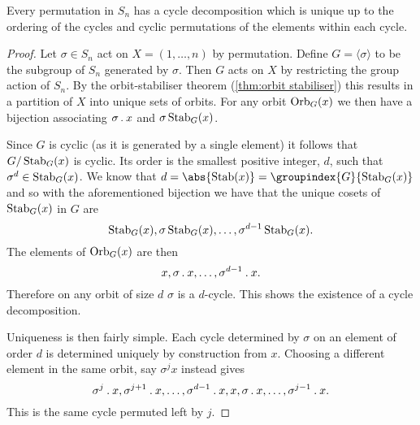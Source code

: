 \begin{lma}{}{}
    Every permutation in \(S_n\) has a cycle decomposition which is unique
    up to the ordering of the cycles and cyclic permutations of the elements within
    each cycle.
    
    \begin{proof}
        Let \(\sigma \in S_n\) act on \(X = (1, \dotsc, n)\) by permutation.
        Define \(G = \langle \sigma \rangle\) to be the subgroup of \(S_n\)
        generated by \(\sigma\).
        Then \(G\) acts on \(X\) by restricting the group action of \(S_n\).
        By the orbit-stabiliser theorem (\cref{thm:orbit stabiliser}) this
        results in a partition of \(X\) into unique sets of orbits.
        For any orbit \(\operatorname{Orb}_{G}(x)\) we then have a bijection associating
        \(\sigma\mathbin{.} x\) and \(\sigma\operatorname{Stab}_G(x)\).
        
        Since \(G\) is cyclic (as it is generated by a single element) it
        follows that \(G/\operatorname{Stab}_G(x)\) is cyclic.
        Its order is the smallest positive integer, \(d\), such that
        \(\sigma^d \in \operatorname{Stab}_G(x)\).
        We know that \(d = \abs{\Stab(x)} = \groupindex{G}{\Stab_G(x)}\) and
        so with the aforementioned bijection we have that the unique cosets of
        \(\operatorname{Stab}_G(x)\) in \(G\) are
        \begin{equation}
            \operatorname{Stab}_G(x), \sigma\operatorname{Stab}_G(x), \dotsc , \sigma^{d - 1}
            \operatorname{Stab}_G(x).
        \end{equation}
        The elements of \(\operatorname{Orb}_G(x)\) are then
        \begin{equation}
            x, \sigma\mathbin{.} x, \dotsc, \sigma^{d - 1} \mathbin{.} x.
        \end{equation}
        Therefore on any orbit of size \(d\) \(\sigma\) is a \(d\)-cycle.
        This shows the existence of a cycle decomposition.
        
        Uniqueness is then fairly simple.
        Each cycle determined by \(\sigma\) on an element of order \(d\) is
        determined uniquely by construction from \(x\).
        Choosing a different element in the same orbit, say \(\sigma^j x\)
        instead gives
        \begin{equation}
            \sigma^j\mathbin{.} x, \sigma^{j + 1} \mathbin{.} x, \dotsc, \sigma^{d -
                1} \mathbin{.} x, x, \sigma \mathbin{.} x, \dotsc, \sigma^{j - 1} \mathbin{.} x.
        \end{equation}
        This is the same cycle permuted left by \(j\).
    \end{proof}
\end{lma}

